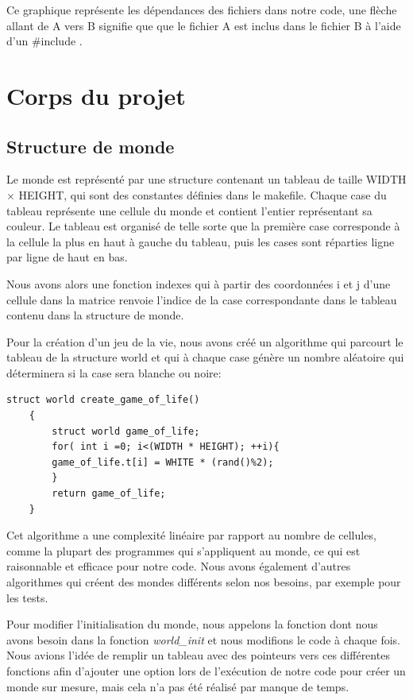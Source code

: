 \documentclass[11pt, a4paper]{article}
\begin{document}
Ce graphique représente les dépendances des fichiers dans notre code, une flèche allant de A vers B signifie que que le fichier A est inclus dans le fichier B à l'aide d'un \#include .

\section{Corps du projet}

\subsection{Structure de monde}

Le monde est représenté par une structure contenant un tableau de taille WIDTH $\times$ HEIGHT, qui sont des constantes définies dans le makefile. Chaque case du tableau représente une cellule du monde et contient l'entier représentant sa couleur. Le tableau est organisé de telle sorte que la première case corresponde à la cellule la plus en haut à gauche du tableau, puis les cases sont réparties ligne par ligne de haut en bas. 

Nous avons alors une fonction indexes qui à partir des coordonnées i et j d'une cellule dans la matrice renvoie l'indice de la case correspondante dans le tableau contenu dans la structure de monde. 

Pour la création d'un jeu de la vie, nous avons créé un algorithme qui parcourt le tableau de la structure world et qui à chaque case génère un nombre aléatoire qui déterminera si la case sera blanche ou noire:

\begin{lstlisting}[frame= single]
    struct world create_game_of_life()
    {
        struct world game_of_life;
        for( int i =0; i<(WIDTH * HEIGHT); ++i){
        game_of_life.t[i] = WHITE * (rand()%2);
        }
        return game_of_life;
    }
\end{lstlisting}


Cet algorithme a une complexité linéaire par rapport au nombre de cellules, comme la plupart des programmes qui s'appliquent au monde, ce qui est raisonnable et efficace pour notre code. Nous avons également d'autres algorithmes qui créent des mondes différents selon nos besoins, par exemple pour les tests. 


Pour modifier l'initialisation du monde, nous appelons la fonction dont nous avons besoin dans la fonction \textit{world\_init} et nous modifions le code à chaque fois. Nous avions l'idée de remplir un tableau avec des pointeurs vers ces différentes fonctions afin d'ajouter une option lors de l'exécution de notre code pour créer un monde sur mesure, mais cela n'a pas été réalisé par manque de temps.
\end{document}
